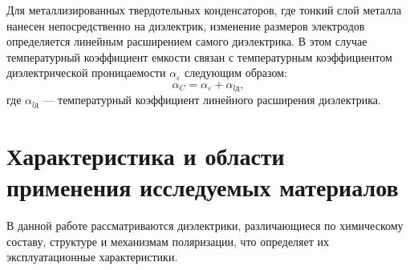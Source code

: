 Для металлизированных твердотельных конденсаторов, где тонкий слой металла нанесен непосредственно на диэлектрик, изменение размеров электродов определяется линейным расширением самого диэлектрика. В этом случае температурный коэффициент емкости связан с температурным коэффициентом диэлектрической проницаемости $\alpha_\varepsilon$ следующим образом:
\begin{equation}
    \alpha_C = \alpha_\varepsilon + \alpha_{l\text{д}},
    \label{form:alphae}
\end{equation}
где $\alpha_{l\text{д}}$ --- температурный коэффициент линейного расширения диэлектрика.

\section*{Характеристика и области применения исследуемых материалов}

В данной работе рассматриваются диэлектрики, различающиеся по химическому составу, структуре и механизмам поляризации, что определяет их эксплуатационные характеристики.

